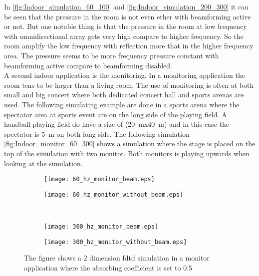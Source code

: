 In \autoref{fig:Indoor_simulation_60_100} and \autoref{fig:Indoor_simulation_200_300} it can be seen that the pressure in the room is not even ether with beamforming active or not. But one notable thing is that the pressure in the room at low frequency with omnidirectional array gets very high compare to higher frequency. So the room amplify the low frequency with reflection more that in the higher frequency area. The pressure seems to be more frequency pressure constant with beamforming active compare to beamforming disabled.\\


A second indoor application is the monitoring. In a monitoring application the room tens to be larger than a living room. The use of monitoring is often at both small and big concert where both dedicated concert hall and sports arenas are used. The following simulating example are done in a sports arena where the spectator area at sports event are on the long side of the playing field. A handball playing field do have a size of (\SI{20}{\meter}x\SI{40}{\meter}) and in this case the spectator is \SI{5}{\meter} on both long side. The following simulation \autoref{fig:Indoor_monitor_60_300} shows a simulation where the stage is placed on the top of the simulation with two monitor. Both monitors is playing upwards when looking at the simulation.


\begin{figure}[H]
\begin{subfigure}[c]{0.5\textwidth}
\texttt{[image: 60\_hz\_monitor\_beam.eps]}
\label{fig:Indoor_monitor_60_on}
\end{subfigure}
\begin{subfigure}[c]{0.5\textwidth}
\texttt{[image: 60\_hz\_monitor\_without\_beam.eps]}
\label{fig:Indoor_monitor_60_off}
\end{subfigure}\\
\hspace{0.1\textheight}
\begin{subfigure}[c]{0.5\textwidth}
\texttt{[image: 300\_hz\_monitor\_beam.eps]}
\label{fig:Indoor_monitor_300_on}
\end{subfigure}
\begin{subfigure}[c]{0.5\textwidth}
\texttt{[image: 300\_hz\_monitor\_without\_beam.eps]}
\label{fig:Indoor_monitor_300_off}
\end{subfigure}
\caption{The figure shows a 2 dimension \gls{fdtd} simulation in a monitor application where the absorbing coefficient is set to 0.5}
		\label{fig:Indoor_monitor_60_300}
\end{figure}

